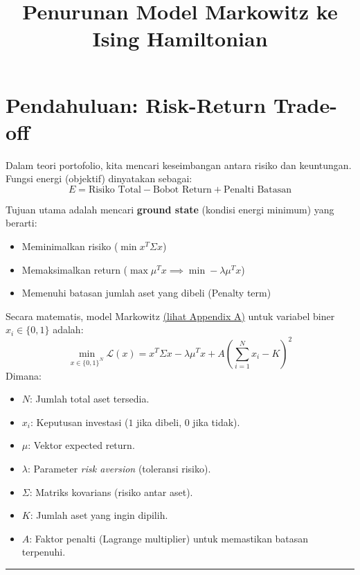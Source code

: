 \documentclass[12pt,a4paper]{article}
\title{Penurunan Model Markowitz ke Ising Hamiltonian}
\author{}
\date{}
\begin{document}
\maketitle
\tableofcontents
\newpage

\hypertarget{pendahuluan-risk-return-trade-off}{%
\section{Pendahuluan: Risk-Return Trade-off}\label{pendahuluan-risk-return-trade-off}}

Dalam teori portofolio, kita mencari keseimbangan antara risiko dan keuntungan. Fungsi energi (objektif) dinyatakan sebagai: \[ E = \text{Risiko Total} - \text{Bobot Return} + \text{Penalti Batasan} \]

Tujuan utama adalah mencari \textbf{ground state} (kondisi energi minimum) yang berarti: 
\begin{itemize}
    \item Meminimalkan risiko (\(\min x^T \Sigma x\))
    \item Memaksimalkan return (\(\max \mu^T x \implies \min -\lambda \mu^T x\))
    \item Memenuhi batasan jumlah aset yang dibeli (Penalty term)
\end{itemize}

Secara matematis, model Markowitz \hyperref[appendix-a]{(lihat Appendix A)} untuk variabel biner \(x_i \in \{0, 1\}\) adalah:
\[ \min_{x \in \{0,1\}^N} \mathcal{L}(x) = x^T \Sigma x - \lambda \mu^T x + A \left(\sum_{i=1}^N x_i - K \right)^2 \] Dimana: 
\begin{itemize}
    \item \(N\): Jumlah total aset tersedia.
    \item \(x_i\): Keputusan investasi (\(1\) jika dibeli, \(0\) jika tidak).
    \item \(\mu\): Vektor expected return.
    \item \(\lambda\): Parameter \emph{risk aversion} (toleransi risiko).
    \item \(\Sigma\): Matriks kovarians (risiko antar aset).
    \item \(K\): Jumlah aset yang ingin dipilih.
    \item \(A\): Faktor penalti (Lagrange multiplier) untuk memastikan batasan terpenuhi.
\end{itemize}

\begin{center}\rule{0.5\linewidth}{0.5pt}\end{center}
\end{document}
